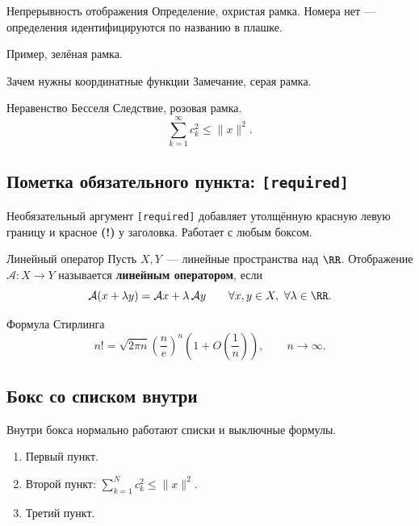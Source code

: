 \begin{Definition}{Непрерывность отображения}{}
	Определение, охристая рамка. Номера нет — определения
	идентифицируются по названию в плашке.
\end{Definition}

\begin{Example}{}{}
	Пример, зелёная рамка.
\end{Example}

\begin{Remark}{Зачем нужны координатные функции}{}
	Замечание, серая рамка.
\end{Remark}

\begin{Corollary}{Неравенство Бесселя}{}
	Следствие, розовая рамка.
	\[
	\sum_{k=1}^{\infty} c_k^2 \le \|x\|^2.
	\]
\end{Corollary}

\subsection{Пометка обязательного пункта: \texttt{[required]}}

Необязательный аргумент \verb|[required]| добавляет утолщённую красную
левую границу и красное \textbf{(!)} у заголовка. Работает с любым боксом.

\begin{Definition}[required]{Линейный оператор}{}
	Пусть $X, Y$~--- линейные пространства над $\RR$. Отображение
	$\mathcal{A}\colon X \to Y$ называется \textbf{линейным оператором}, если
	\[
	\mathcal{A}(x + \lambda y) = \mathcal{A}x + \lambda\,\mathcal{A}y
	\qquad \forall x, y \in X,\ \forall \lambda \in \RR.
	\]
\end{Definition}

\begin{Theorem}[required]{Формула Стирлинга}{}
	\[
	n!=\sqrt{2\pi n}\left(\frac{n}{e}\right)^n\left(1+O\!\left(\frac1n\right)\right),
	\qquad n\to\infty.
	\]
\end{Theorem}

\subsection{Бокс со списком внутри}

\begin{Remark}{}{}
	Внутри бокса нормально работают списки и выключные формулы.
	\begin{enumerate}
		\item Первый пункт.
		\item Второй пункт: $\displaystyle \sum_{k=1}^{N} c_k^2 \le \|x\|^2$.
		\item Третий пункт.
	\end{enumerate}
\end{Remark}
